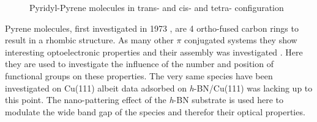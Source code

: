 \begin{figure}[h!]
	\begin{center}
	\end{center}
	\caption{Pyridyl-Pyrene molecules in trans-  and cis-  and tetra-  configuration}
	\label{fig:pyrene}
\end{figure}

Pyrene molecules, first investigated in 1973 \cite{khan_electronic_1973}, are 4 ortho-fused carbon rings to result in a rhombic structure. As many other $\pi$ conjugated systems they show interesting optoelectronic properties \cite{Crawford_experimental_2011, Lee_enhanced_2012, Feng_functionalization_2016, Maeda_alkynylpyrenes_2006, Kurata_donor_2017} and their assembly was investigated \cite{pham_self-assembly_2014, matena_aggregation_2010, della_pia_anomalous_2014, pham_comparing_2016}. Here they are used to investigate the influence of the number and position of functional groups on these properties. The very same species have been investigated on Cu(111) albeit data adsorbed on \textit{h}-BN/Cu(111) was lacking up to this point. The nano-pattering effect of the \textit{h}-BN substrate is used here to modulate the wide band gap of the species and therefor their optical properties.


